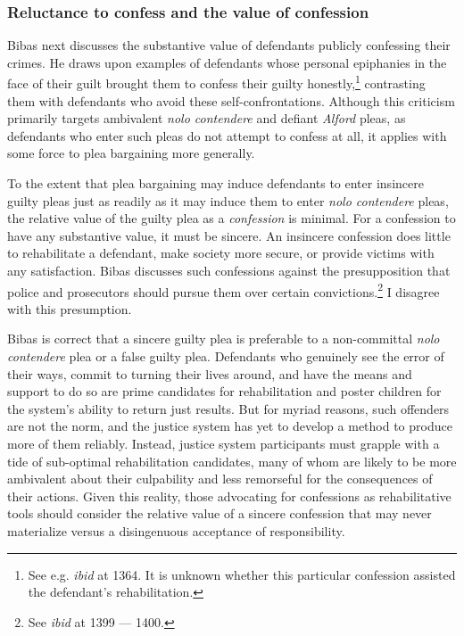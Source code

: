 \subsubsection{Reluctance to confess and the value of confession}

Bibas next discusses the substantive value of defendants publicly confessing their crimes. He draws upon examples of defendants whose personal epiphanies in the face of their guilt brought them to confess their guilty honestly,\footnote{See e.g. \textit{ibid} at 1364. It is unknown whether this particular confession assisted the defendant's rehabilitation.} contrasting them with defendants who avoid these self-confrontations. Although this criticism primarily targets ambivalent \textit{nolo contendere} and defiant \textit{Alford} pleas, as defendants who enter such pleas do not attempt to confess at all, it applies with some force to plea bargaining more generally. 

To the extent that plea bargaining may induce defendants to enter insincere guilty pleas just as readily as it may induce them to enter \textit{nolo contendere} pleas, the relative value of the guilty plea as a \textit{confession} is minimal. For a confession to have any substantive value, it must be sincere. An insincere confession does little to rehabilitate a defendant, make society more secure, or provide victims with any satisfaction. Bibas discusses such confessions against the presupposition that police and prosecutors should pursue them over certain convictions.\footnote{See \textit{ibid} at 1399 — 1400.} I disagree with this presumption. 

Bibas is correct that a sincere guilty plea is preferable to a non-committal \textit{nolo contendere} plea or a false guilty plea. Defendants who genuinely see the error of their ways, commit to turning their lives around, and have the means and support to do so are prime candidates for rehabilitation and poster children for the system's ability to return just results. But for myriad reasons, such offenders are not the norm, and the justice system has yet to develop a method to produce more of them reliably. Instead, justice system participants must grapple with a tide of sub-optimal rehabilitation candidates, many of whom are likely to be more ambivalent about their culpability and less remorseful for the consequences of their actions. Given this reality, those advocating for confessions as rehabilitative tools should consider the relative value of a sincere confession that may never materialize versus a disingenuous acceptance of responsibility. 

